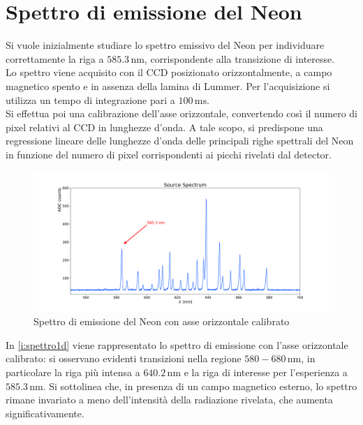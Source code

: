 \documentclass[twocolumn,10pt]{asme2ej}
\begin{document}
\vspace{-10pt}
\section{Spettro di emissione del Neon}\label{s:neon}

Si vuole inizialmente studiare lo spettro emissivo del Neon per individuare correttamente la riga a $585.3
\,\si{\nano\metre}$, corrispondente alla transizione di interesse.\\
Lo spettro viene acquisito con il CCD posizionato orizzontalmente, a campo magnetico spento e in assenza della lamina di
Lummer. Per l'acquisizione si utilizza un tempo di integrazione pari a $100 \,\si{\milli\second}$. \\
Si effettua poi una calibrazione dell'asse orizzontale, convertendo così il numero di pixel relativi al CCD in lunghezze
d'onda. A tale scopo, si predispone una regressione lineare delle lunghezze d'onda delle principali righe spettrali del
Neon in funzione del numero di pixel corrispondenti ai picchi rivelati dal detector. 
 
\begin{figure}
    \centering
    \includegraphics[width=\textwidth]{../Spectrum/SpectrumPlots/spettro1d_Boff.png}
    \caption{Spettro di emissione del Neon con asse orizzontale calibrato}
    \label{i:spettro1d}
    \vspace{-10pt}
\end{figure}


In \autoref{i:spettro1d} viene rappresentato lo spettro di emissione con l'asse orizzontale calibrato: si
osservano evidenti transizioni nella regione $580-680 \,\si{\nano\metre}$, in particolare la riga più intensa a $640.2
\,\si{\nano\metre}$ e la riga di interesse per l'esperienza a $585.3 \,\si{\nano\metre}$. Si sottolinea che, in presenza
di un campo magnetico esterno, lo spettro rimane invariato a meno dell'intensità della radiazione rivelata, che aumenta
significativamente. 
\end{document}
